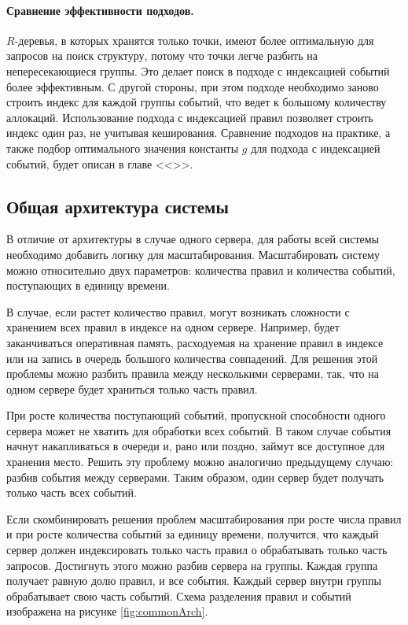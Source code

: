 \documentclass[14pt]{article}
\begin{document}
\paragraph{Сравнение эффективности подходов.} $R$-деревья, в которых хранятся только точки, имеют более оптимальную для запросов на поиск структуру, потому что точки легче разбить на непересекающиеся группы. Это делает поиск в подходе с индексацией событий более эффективным. С другой стороны, при этом подходе необходимо заново строить индекс для каждой группы событий, что ведет к большому количеству аллокаций. Использование подхода с индексацией правил позволяет строить индекс один раз, не учитывая кеширования. Сравнение подходов на практике, а также подбор оптимального значения константы $g$ для подхода с индексацией событий, будет описан в главе <<>>.

\subsection{Общая архитектура системы}
\label{section:commonArch}
В отличие от архитектуры в случае одного сервера, для работы всей системы необходимо добавить логику для масштабирования. Масштабировать систему можно относительно двух параметров: количества правил и количества событий, поступающих в единицу времени.

В случае, если растет количество правил, могут возникать сложности с хранением всех правил в индексе на одном сервере. Например, будет заканчиваться оперативная память, расходуемая на хранение правил в индексе или на запись в очередь большого количества совпадений. Для решения этой проблемы можно разбить правила между несколькими серверами, так, что на одном сервере будет храниться только часть правил.

При росте количества поступающий событий, пропускной способности одного сервера может не хватить для обработки всех событий. В таком случае события начнут накапливаться в очереди и, рано или поздно, займут все доступное для хранения место. Решить эту проблему можно аналогично предыдущему случаю: разбив события между серверами. Таким образом, один сервер будет получать только часть всех событий.

Если скомбинировать решения проблем масштабирования при росте числа правил и при росте количества событий за единицу времени, получится, что каждый сервер должен индексировать только часть правил о обрабатывать только часть запросов. Достигнуть этого можно разбив сервера на группы. Каждая группа получает равную долю правил, и все события. Каждый сервер внутри группы обрабатывает свою часть событий. Схема разделения правил и событий изображена на рисунке \ref{fig:commonArch}.
\end{document}
